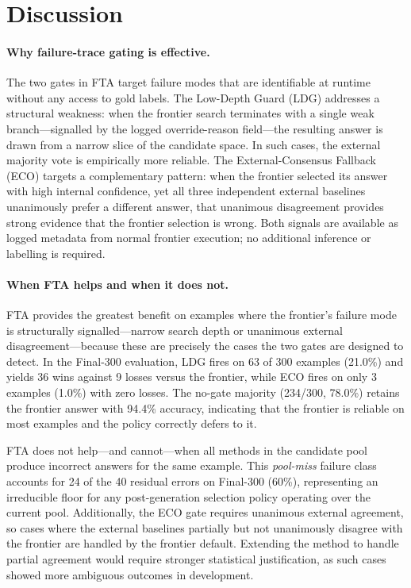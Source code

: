 \section{Discussion}
\label{sec:discussion}

\paragraph{Why failure-trace gating is effective.}
The two gates in FTA target failure modes that are identifiable at runtime
without any access to gold labels.
The Low-Depth Guard (LDG) addresses a structural weakness: when the frontier
search terminates with a single weak branch---signalled by the logged
override-reason field---the resulting answer is drawn from a narrow slice of
the candidate space.
In such cases, the external majority vote is empirically more reliable.
The External-Consensus Fallback (ECO) targets a complementary pattern: when
the frontier selected its answer with high internal confidence, yet all three
independent external baselines unanimously prefer a different answer, that
unanimous disagreement provides strong evidence that the frontier selection
is wrong.
Both signals are available as logged metadata from normal frontier execution;
no additional inference or labelling is required.

\paragraph{When FTA helps and when it does not.}
FTA provides the greatest benefit on examples where the frontier's failure mode
is structurally signalled---narrow search depth or unanimous external
disagreement---because these are precisely the cases the two gates are designed
to detect.
In the Final-300 evaluation, LDG fires on 63 of 300 examples (21.0\%) and
yields 36 wins against 9 losses versus the frontier, while ECO fires on only
3 examples (1.0\%) with zero losses.
The no-gate majority (234/300, 78.0\%) retains the frontier answer with 94.4\%
accuracy, indicating that the frontier is reliable on most examples and the
policy correctly defers to it.

FTA does not help---and cannot---when all methods in the candidate pool produce
incorrect answers for the same example.
This \emph{pool-miss} failure class accounts for 24 of the 40 residual errors
on Final-300 (60\%), representing an irreducible floor for any post-generation
selection policy operating over the current pool.
Additionally, the ECO gate requires unanimous external agreement, so cases
where the external baselines partially but not unanimously disagree with the
frontier are handled by the frontier default.
Extending the method to handle partial agreement would require stronger
statistical justification, as such cases showed more ambiguous outcomes in
development.

